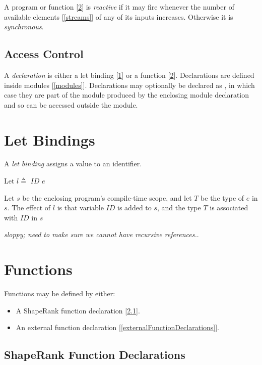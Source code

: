\documentclass{article}
\begin{document}
A program or function [\ref{functions}] is {\em reactive} if it may fire whenever the number of available elements [\ref{streams}] of any of its inputs increases. Otherwise it is {\em synchronous}.

\subsection{Access Control}
\label{accessControl}

A {\em declaration} is either a let binding [\ref{letBindings}] or a function [\ref{functions}]. Declarations are defined inside modules [\ref{modules}]. Declarations may optionally be declared as \PUBLIC{}, in which case they are part of the module produced by the enclosing module declaration and so can be accessed outside the module.


\section{Let Bindings}
\label{letBindings}

A {\em let binding} assigns a value to an identifier. 

\LetBinding{}

Let  $l \triangleq $ \LET{} $ID$ \BIND{} $e$

Let $s$ be the enclosing program's compile-time scope, and let $T$ be the type of $e$ in $s$.
The effect of $l$ is that variable $ID$ is added to $s$, and the type $T$ is associated with $ID$ in $s$

{\em sloppy; need to make sure we cannot have recursive references.}.


\section{Functions}
\label{functions}

Functions may be defined by either:
\begin{itemize}
\item A ShapeRank function declaration [\ref{shapeRankFunctionDeclarations}].
\item An external function declaration [\ref{externalFunctionDeclarations}]. 
\end{itemize}

\subsection{ShapeRank Function Declarations}
\label{shapeRankFunctionDeclarations}
\end{document}
